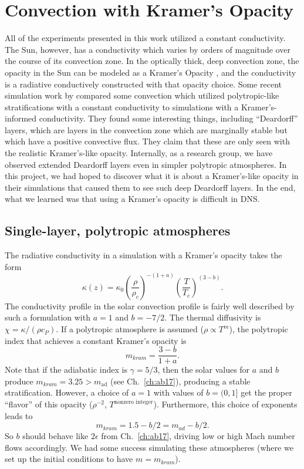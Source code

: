 \section{Convection with Kramer's Opacity}
All of the experiments presented in this work utilized a constant conductivity.
The Sun, however, has a conductivity which varies by orders of magnitude over the course of its convection zone.
In the optically thick, deep convection zone, the opacity in the Sun can be modeled as a Kramer's Opacity \citep[see e.g.,][]{brandenburg2016}, and the conductivity is a radiative conductively constructed with that opacity choice.
Some recent simulation work by \citet{kapyla&all2017} compared some convection which utilized polytropic-like stratifications with a constant conductivity to simulations with a Kramer's-informed conductivity.
They found some interesting things, including ``Deardorff'' layers, which are layers in the convection zone which are marginally stable but which have a positive convective flux.
They claim that these are only seen with the realistic Kramer's-like opacity.
Internally, as a research group, we have observed extended Deardorff layers even in simpler polytropic atmospheres.
In this project, we had hoped to discover what it is about a Kramer's-like opacity in their simulations that caused them to see such deep Deardorff layers.
In the end, what we learned was that using a Kramer's opacity is difficult in DNS.

\subsection{Single-layer, polytropic atmospheres}
The radiative conductivity in a simulation with a Kramer's opacity \citep{kapyla&all2017} takes the form
$$
\kappa(z) = \kappa_0 \left(\frac{\rho}{\rho_c}\right)^{-(1+a)} \left(\frac{T}{T_c}\right)^{(3-b)}.
$$
The conductivity profile in the solar convection profile is fairly well described by such a formulation with $a = 1$ and $b = -7/2$.
The thermal diffusivity is $\chi = \kappa / (\rho c_P)$. 
If a polytropic atmosphere is assumed ($\rho \propto T^m$), the polytropic index that achieves a constant Kramer's opacity \citep{jones1976} is
$$
m_{kram} = \frac{3 - b}{1 + a}.
$$
Note that if the adiabatic index is $\gamma = 5/3$, then the solar values for $a$ and $b$ produce $m_{kram} = 3.25 > m_{\text{ad}}$ (see Ch.~\ref{ch:ab17}), producing a stable stratification.
However, a choice of $a = 1$ with values of $b = (0, 1]$ get the proper ``flavor'' of this opacity ($\rho^{-2}$, $T^{\text{nonzero integer}}$).
Furthermore, this choice of exponents leads to
\begin{equation}
m_{kram} = 1.5 - b/2 = m_{ad} - b/2.
\end{equation}
So $b$ should behave like $2\epsilon$ from Ch.~\ref{ch:ab17}, driving low or high Mach number flows accordingly.
We had some success simulating these atmospheres (where we set up the initial conditions to have $m = m_{kram}$).

